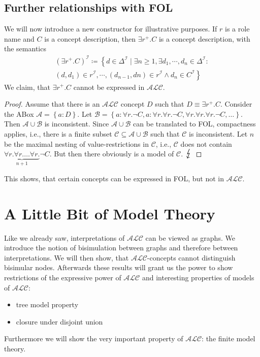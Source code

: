 \section{Further relationships with FOL}
We will now introduce a new constructor for illustrative purposes.
If $r$ is a role name and $C$ is a concept description, then $\exists r^+.C $
is a concept description, with the semantics
\[
\begin{split}
	(\exists r^+.C)^\mathcal{I} \coloneqq \left\{ d \in \Delta^{\mathcal{I}} \mid \exists n \geq 1, \exists d_1,\cdots, d_n \in \Delta^\mathcal{I} : \right.\\
		\left. (d,d_1) \in r^\mathcal{I}, \cdots, (d_{n-1},dn) \in r^\mathcal{I} \land d_n \in C^\mathcal{I}\right\}
\end{split}
\]
We claim, that $\exists r^+.C$ cannot be expressed in $\mathcal{ALC}$.
\begin{proof}
	Assume that there is an $\mathcal{ALC}$ concept $D$ such that $D \equiv \exists r^+.C$.
	Consider the ABox $\mathcal{A} = \left\{ a:D \right\}$.
	Let $ \mathcal{B} = \left\{ a : \forall r.\neg C, a: \forall r.\forall r.\neg C, \forall r.\forall r.\forall r.\neg C,\ldots \right\}$.
	Then $\mathcal{A} \cup \mathcal{B}$ is inconsistent.
	Since $\mathcal{A} \cup \mathcal{B}$ can be translated to FOL, compactness applies, i.e.,
	there is a finite subset $\mathcal{C} \subseteq \mathcal{A} \cup \mathcal{B}$ such that $\mathcal{C}$ is inconsistent.
	Let $n$ be the maximal nesting of value-restrictions in $\mathcal{C}$, i.e.,
	$\mathcal{C}$ does not contain $\underbrace{\forall r. \forall r. \ldots \forall r.}_{n+1} \neg C$.
	But then there obviously is a model of $\mathcal{C}$. $\contra$
\end{proof}
This shows, that certain concepts can be expressed in FOL, but not in $\mathcal{ALC}$.

\chapter{A Little Bit of Model Theory}
Like we already saw, interpretations of $\mathcal{ALC}$ can be viewed as graphs.
We introduce the notion of bisimulation between graphs and therefore between interpretations.
We will then show, that $\mathcal{ALC}$-concepts cannot distinguish bisimular nodes.
Afterwards these results will grant us the power to show restrictions of the expressive power of $\mathcal{ALC}$ and
interesting properties of models of $\mathcal{ALC}$:
\begin{itemize}
	\item tree model property
	\item closure under disjoint union
\end{itemize}
Furthermore we will show the very important property of $\mathcal{ALC}$: the finite model theory.

